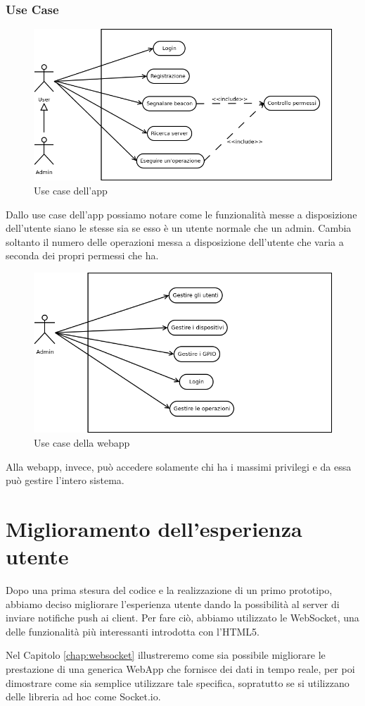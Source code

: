 \subsubsection{Use Case}
\begin{figure}[h]
\centering
\includegraphics[width=1\textwidth]{Immagini/usecaseApp.png} 
\caption{Use case dell'app}
\end{figure}

Dallo use case dell'app possiamo notare come le funzionalità messe a disposizione dell'utente siano le stesse sia se esso è un utente normale che un admin.
Cambia soltanto il numero delle operazioni messa a disposizione dell'utente che varia a seconda dei propri permessi che ha.

\begin{figure}[h]
\centering
\includegraphics[width=1\textwidth]{Immagini/usecaseWebApp.png} 
\caption{Use case della webapp}
\end{figure}

Alla webapp, invece, può accedere solamente chi ha i massimi privilegi e da essa può gestire l'intero sistema.
\section{Miglioramento dell'esperienza utente}
Dopo una prima stesura del codice e la realizzazione di un primo prototipo,
abbiamo deciso migliorare l'esperienza utente dando la possibilità al server di inviare notifiche push ai client.
Per fare ciò, abbiamo utilizzato le WebSocket, una delle funzionalità più interessanti introdotta con l'HTML5.

Nel Capitolo \ref{chap:websocket} illustreremo come sia possibile migliorare le  prestazione di una generica WebApp che fornisce dei dati in tempo reale, per poi dimostrare come sia semplice utilizzare tale specifica, sopratutto se si utilizzano delle libreria ad hoc come Socket.io. 